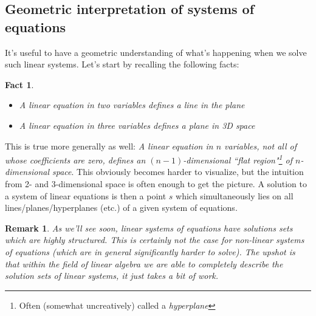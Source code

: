 \documentclass[12pt]{article}
\numberwithin{equation}{subsection}
\numberwithin{figure}{subsection}
\newtheorem{fact}[subsection]{Fact}
\theoremstyle{note}
\newtheorem{remark}[subsection]{Remark}
\begin{document}
\subsection{Geometric interpretation of systems of equations}
It's useful to have a geometric understanding of what's happening when we solve such linear systems. Let's start by recalling the following facts:
\begin{fact}$~$
	\begin{itemize}
		\item A linear equation in two variables defines a line in the plane
		\item A linear equation in three variables defines a plane in 3D space
	\end{itemize}
\end{fact}
This is true more generally as well: \textit{A linear equation in $n$ variables, not all of whose coefficients are zero, defines an $(n-1)$-dimensional ``flat region"\footnote{Often (somewhat uncreatively) called a \textit{hyperplane}} of $n$-dimensional space}. This obviously becomes harder to visualize, but the intuition from 2- and 3-dimensional space is often enough to get the picture. A solution to a system of linear equations is then a point $s$ which simultaneously lies on all lines/planes/hyperplanes (etc.) of a given system of equations. 

\begin{remark}As we'll see soon, \textit{linear} systems of equations have solutions sets which are highly structured. This is certainly not the case for \textit{non-linear} systems of equations (which are in general significantly harder to solve). The upshot is that within the field of linear algebra we are able to \textit{completely} describe the solution sets of linear systems, it just takes a bit of work. \end{remark}
\end{document}
